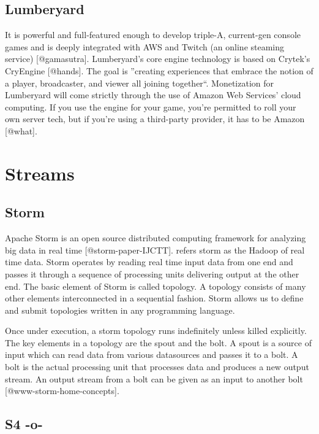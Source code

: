      
\subsection{Lumberyard}
     
It is powerful and full-featured enough to develop triple-A,
current-gen console games and is deeply integrated with AWS and Twitch
(an online steaming service) [@gamasutra]. Lumberyard's core
engine technology is based on Crytek's CryEngine [@hands]. The
goal is ''creating experiences that embrace the notion of a player,
broadcaster, and viewer all joining
together``\cite{gamasutra}. Monetization for Lumberyard will come
strictly through the use of Amazon Web Services' cloud computing. If
you use the engine for your game, you're permitted to roll your own
server tech, but if you're using a third-party provider, it has to be
Amazon [@what].

\section{Streams}

\subsection{Storm}

Apache Storm is an open source distributed computing framework for
analyzing big data in real time [@storm-paper-IJCTT]. refers storm
as the Hadoop of real time data. Storm operates by reading real time
input data from one end and passes it through a sequence of processing
units delivering output at the other end. The basic element of Storm
is called topology. A topology consists of many other elements
interconnected in a sequential fashion. Storm allows us to define and
submit topologies written in any programming language.

Once under execution, a storm topology runs indefinitely unless killed
explicitly. The key elements in a topology are the spout and the
bolt. A spout is a source of input which can read data from various
datasources and passes it to a bolt. A bolt is the actual processing
unit that processes data and produces a new output stream. An output
stream from a bolt can be given as an input to another
bolt [@www-storm-home-concepts].
     
\subsection{S4 -o-}


